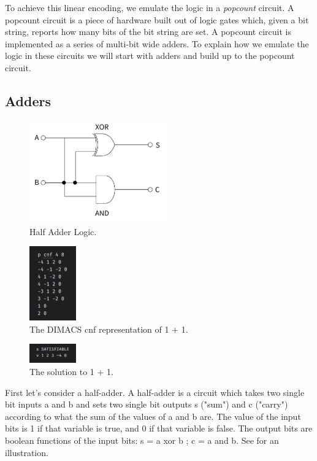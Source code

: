 To achieve this linear encoding, we emulate the logic in a \emph{popcount} circuit. A popcount circuit is a piece of hardware built out of logic gates which, given a bit string, reports how many bits of the bit string are set. A popcount circuit is implemented as a series of multi-bit wide adders. To explain how we emulate the logic in these circuits we will start with adders and build up to the popcount circuit.

\subsection{Adders}

\begin{figure}[t]
    \centerline{\includegraphics[origin=c,width=6cm]{fig_half_adder}}
    \caption{Half Adder Logic.}%
    \label{fig:half_adder}%
\end{figure}

\begin{figure}[t]
    \centerline{\includegraphics[origin=c,width=2cm]{fig_one_plus_one_cnf}}
    \caption{The DIMACS cnf representation of 1 + 1.}%
    \label{fig:one_plus_one_cnf}%
\end{figure}

\begin{figure}[t]
    \centerline{\includegraphics[origin=c,width=2cm]{fig_one_plus_one_sol}}
    \caption{The solution to 1 + 1.}%
    \label{fig:one_plus_one_sol}%
\end{figure}

First let's consider a half-adder. A half-adder is a circuit which takes two single bit inputs a and b and sets two single bit outputs s ("sum") and c ("carry") according to what the sum of the values of a and b are. The value of the input bits is 1 if that variable is true, and 0 if that variable is false. The output bits are boolean functions of the input bits: s = a xor b ; c = a and b. See  for an illustration.

